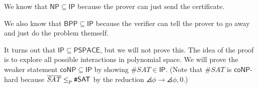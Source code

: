 \documentclass{scrartcl}
\begin{document}
We know that \(\mathsf{NP} \subseteq \mathsf{IP}\) because
the prover can just send the certificate.

We also know that \(\mathsf{BPP} \subseteq \mathsf{IP}\) because
the verifier can tell the prover to go away and just do the problem themself.

It turns out that \(\mathsf{IP} \subseteq \mathsf{PSPACE}\),
but we will not prove this. The idea of the proof is to
explore all possible interactions in polynomial space.
We will prove the weaker statement \(\mathsf{coNP} \subseteq \mathsf{IP}\)
by showing \(\texttt\#\mathit{SAT} \in \mathsf{IP}\).
(Note that \(\texttt\#\mathit{SAT}\) is \(\mathsf{coNP}\)-hard
  because \(\overline{\mathit{SAT}} \mathrel{\leq_p} \texttt\#\mathsf{SAT}\)
  by the reduction \(\angles{\phi} \to \angles{\phi, 0}\).)
\end{document}
